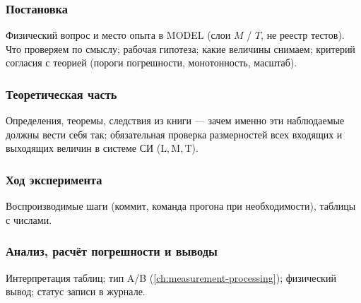 \subsubsection*{Постановка}
Физический вопрос и место опыта в MODEL (слои $M$ / $T$, не реестр тестов).
Что проверяем по смыслу; рабочая гипотеза; какие величины снимаем; критерий согласия с теорией (пороги погрешности, монотонность, масштаб).

\subsubsection*{Теоретическая часть}
Определения, теоремы, следствия из книги --- зачем именно эти наблюдаемые должны вести себя так; обязательная проверка размерностей всех входящих и выходящих величин в системе СИ ($\mathrm{L, M, T}$).

\subsubsection*{Ход эксперимента}
Воспроизводимые шаги (коммит, команда прогона при необходимости), таблицы с числами.

\subsubsection*{Анализ, расчёт погрешности и выводы}
Интерпретация таблиц; тип A/B (\cref{ch:measurement-processing}); физический вывод; статус записи в журнале.
